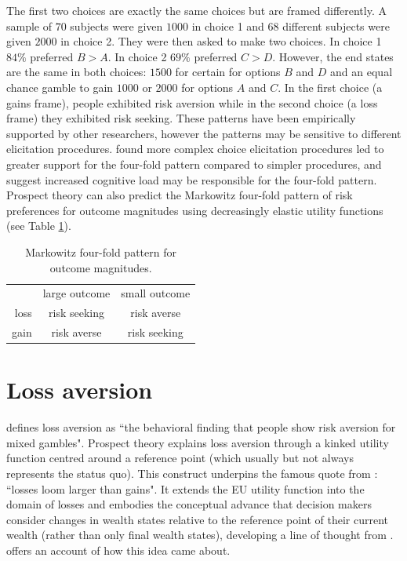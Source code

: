 \documentclass{article}\usepackage[]{graphicx}\usepackage[]{color}
\begin{document}
The first two choices are exactly the same choices but are framed differently.
A sample of $70$ subjects were given $1000$ in choice 1 and $68$ different subjects were given $2000$ in choice 2. They were then asked to make two choices. In choice 1 $84\%$ preferred $B > A$. In choice 2 $69\%$ preferred $C > D$. However, the end states are the same in both choices: $1500$ for certain for options $B$ and $D$ and an equal chance gamble to gain $1000$ or $2000$ for options $A$ and $C$. In the first choice (a gains frame), people exhibited risk aversion while in the second choice (a loss frame) they exhibited risk seeking. These patterns have been empirically supported by other researchers, however the patterns may be sensitive to different elicitation procedures. \citet[][]{Harbaugh_Krause_Vesterlund_2010} found more complex choice elicitation procedures led to greater support for the four-fold pattern compared to simpler procedures,
and suggest increased cognitive load may be responsible for the four-fold pattern. Prospect theory can
also predict the Markowitz four-fold pattern of risk preferences for outcome magnitudes \cite{Markowitz_1952} using decreasingly elastic utility functions \cite[][]{Scholten_Read_2014} (see Table \ref{markowitz_four_fold_table}).

\begin{table}[h]
\caption{Markowitz four-fold pattern for outcome magnitudes.}
\centering
\begin{tabular}{ r|c|c| }
\multicolumn{1}{r}{}
 &  \multicolumn{1}{c}{large outcome}
 & \multicolumn{1}{c}{small outcome} \\
\cline{2-3}
loss & risk seeking & risk averse \\
\cline{2-3}
gain & risk averse & risk seeking \\
\cline{2-3}
\end{tabular}
\label{markowitz_four_fold_table}
\end{table}


\section{Loss aversion}

\citet[][p. 466]{Birnbaum_2008} defines loss aversion as ``the behavioral finding that people show risk
aversion for mixed gambles".
Prospect theory explains loss aversion through a kinked utility function centred around a reference point (which usually but not always represents the status quo).
This construct underpins the famous quote from \citet[][p. 279]{Kahneman_Tversky_1979}: ``losses loom larger than gains". It extends the EU utility function into the domain of losses and embodies the conceptual advance that decision makers consider changes in wealth states
relative to the reference point of their current wealth (rather than only final wealth states), developing a line of thought from \cite{Markowitz_1952}. \citet[][p. 269-277]{Kahneman_2011} offers an account of how this idea came about.
\end{document}
